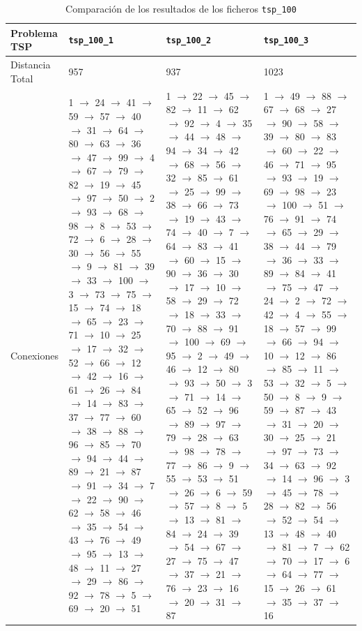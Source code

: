 \documentclass[a4paper,11pt]{article}
\begin{document}
\begin{table}[!htbp]
\label{results_tsp_100}
\centering
\begin{tabularx}{\textwidth}{|p{2cm}|X|X|X|}
\hline
Problema TSP    & \texttt{tsp\_100\_1}  & \texttt{tsp\_100\_2}  & \texttt{tsp\_100\_3}  \\ \hline
Distancia Total & 957	& 937	& 1023	\\ \hline
Conexiones	& 1 $\to$ 24 $\to$ 41 $\to$ 59 $\to$ 57 $\to$ 40 $\to$ 31 $\to$ 64 $\to$ 80 $\to$ 63 $\to$ 36 $\to$ 47 $\to$ 99 $\to$ 4 $\to$ 67 $\to$ 79 $\to$ 82 $\to$ 19 $\to$ 45 $\to$ 97 $\to$ 50 $\to$ 2 $\to$ 93 $\to$ 68 $\to$ 98 $\to$ 8 $\to$ 53 $\to$ 72 $\to$ 6 $\to$ 28 $\to$ 30 $\to$ 56 $\to$ 55 $\to$ 9 $\to$ 81 $\to$ 39 $\to$ 33 $\to$ 100 $\to$ 3 $\to$ 73 $\to$ 75 $\to$ 15 $\to$ 74 $\to$ 18 $\to$ 65 $\to$ 23 $\to$ 71 $\to$ 10 $\to$ 25 $\to$ 17 $\to$ 32 $\to$ 52 $\to$ 66 $\to$ 12 $\to$ 42 $\to$ 16 $\to$ 61 $\to$ 26 $\to$ 84 $\to$ 14 $\to$ 83 $\to$ 37 $\to$ 77 $\to$ 60 $\to$ 38 $\to$ 88 $\to$ 96 $\to$ 85 $\to$ 70 $\to$ 94 $\to$ 44 $\to$ 89 $\to$ 21 $\to$ 87 $\to$ 91 $\to$ 34 $\to$ 7 $\to$ 22 $\to$ 90 $\to$ 62 $\to$ 58 $\to$ 46 $\to$ 35 $\to$ 54 $\to$ 43 $\to$ 76 $\to$ 49 $\to$ 95 $\to$ 13 $\to$ 48 $\to$ 11 $\to$ 27 $\to$ 29 $\to$ 86 $\to$ 92 $\to$ 78 $\to$ 5 $\to$ 69 $\to$ 20 $\to$ 51	& 1 $\to$ 22 $\to$ 45 $\to$ 82 $\to$ 11 $\to$ 62 $\to$ 92 $\to$ 4 $\to$ 35 $\to$ 44 $\to$ 48 $\to$ 94 $\to$ 34 $\to$ 42 $\to$ 68 $\to$ 56 $\to$ 32 $\to$ 85 $\to$ 61 $\to$ 25 $\to$ 99 $\to$ 38 $\to$ 66 $\to$ 73 $\to$ 19 $\to$ 43 $\to$ 74 $\to$ 40 $\to$ 7 $\to$ 64 $\to$ 83 $\to$ 41 $\to$ 60 $\to$ 15 $\to$ 90 $\to$ 36 $\to$ 30 $\to$ 17 $\to$ 10 $\to$ 58 $\to$ 29 $\to$ 72 $\to$ 18 $\to$ 33 $\to$ 70 $\to$ 88 $\to$ 91 $\to$ 100 $\to$ 69 $\to$ 95 $\to$ 2 $\to$ 49 $\to$ 46 $\to$ 12 $\to$ 80 $\to$ 93 $\to$ 50 $\to$ 3 $\to$ 71 $\to$ 14 $\to$ 65 $\to$ 52 $\to$ 96 $\to$ 89 $\to$ 97 $\to$ 79 $\to$ 28 $\to$ 63 $\to$ 98 $\to$ 78 $\to$ 77 $\to$ 86 $\to$ 9 $\to$ 55 $\to$ 53 $\to$ 51 $\to$ 26 $\to$ 6 $\to$ 59 $\to$ 57 $\to$ 8 $\to$ 5 $\to$ 13 $\to$ 81 $\to$ 84 $\to$ 24 $\to$ 39 $\to$ 54 $\to$ 67 $\to$ 27 $\to$ 75 $\to$ 47 $\to$ 37 $\to$ 21 $\to$ 76 $\to$ 23 $\to$ 16 $\to$ 20 $\to$ 31 $\to$ 87	& 1 $\to$ 49 $\to$ 88 $\to$ 67 $\to$ 68 $\to$ 27 $\to$ 90 $\to$ 58 $\to$ 39 $\to$ 80 $\to$ 83 $\to$ 60 $\to$ 22 $\to$ 46 $\to$ 71 $\to$ 95 $\to$ 93 $\to$ 19 $\to$ 69 $\to$ 98 $\to$ 23 $\to$ 100 $\to$ 51 $\to$ 76 $\to$ 91 $\to$ 74 $\to$ 65 $\to$ 29 $\to$ 38 $\to$ 44 $\to$ 79 $\to$ 36 $\to$ 33 $\to$ 89 $\to$ 84 $\to$ 41 $\to$ 75 $\to$ 47 $\to$ 24 $\to$ 2 $\to$ 72 $\to$ 42 $\to$ 4 $\to$ 55 $\to$ 18 $\to$ 57 $\to$ 99 $\to$ 66 $\to$ 94 $\to$ 10 $\to$ 12 $\to$ 86 $\to$ 85 $\to$ 11 $\to$ 53 $\to$ 32 $\to$ 5 $\to$ 50 $\to$ 8 $\to$ 9 $\to$ 59 $\to$ 87 $\to$ 43 $\to$ 31 $\to$ 20 $\to$ 30 $\to$ 25 $\to$ 21 $\to$ 97 $\to$ 73 $\to$ 34 $\to$ 63 $\to$ 92 $\to$ 14 $\to$ 96 $\to$ 3 $\to$ 45 $\to$ 78 $\to$ 28 $\to$ 82 $\to$ 56 $\to$ 52 $\to$ 54 $\to$ 13 $\to$ 48 $\to$ 40 $\to$ 81 $\to$ 7 $\to$ 62 $\to$ 70 $\to$ 17 $\to$ 6 $\to$ 64 $\to$ 77 $\to$ 15 $\to$ 26 $\to$ 61 $\to$ 35 $\to$ 37 $\to$ 16	\\ \hline
\end{tabularx}
\caption{Comparación de los resultados de los ficheros \texttt{tsp\_100}}
\end{table}
\end{document}
